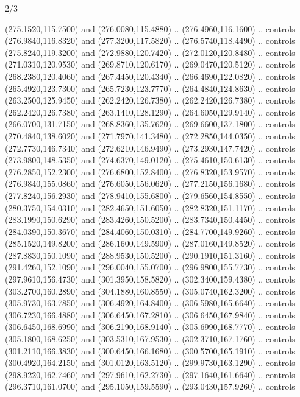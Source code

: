 \begin{flagdescription}{2/3}
\begin{scope}[xshift=0.5\flaglength,yshift=0.5\flagwidth,scale=\flagwidth/259.2]
\begin{scope}[y=0.8pt, x=0.8pt, yscale=-1,shift={(-243,-162)}]
      (275.1520,115.7500) and (276.0080,115.4880) .. (276.4960,116.1600) .. controls
      (276.9840,116.8320) and (277.3200,117.5820) .. (276.5740,118.4490) .. controls
      (275.8240,119.3200) and (272.9880,120.7420) .. (272.0120,120.8480) .. controls
      (271.0310,120.9530) and (269.8710,120.6170) .. (269.0470,120.5120) .. controls
      (268.2380,120.4060) and (267.4450,120.4340) .. (266.4690,122.0820) .. controls
      (265.4920,123.7300) and (265.7230,123.7770) .. (264.4840,124.8630) .. controls
      (263.2500,125.9450) and (262.2420,126.7380) .. (262.2420,126.7380) .. controls
      (262.2420,126.7380) and (263.1410,128.1290) .. (264.6050,129.9140) .. controls
      (266.0700,131.7150) and (268.8360,135.7620) .. (269.6600,137.1800) .. controls
      (270.4840,138.6020) and (271.7970,141.3480) .. (272.2850,144.0350) .. controls
      (272.7730,146.7340) and (272.6210,146.9490) .. (273.2930,147.7420) .. controls
      (273.9800,148.5350) and (274.6370,149.0120) .. (275.4610,150.6130) .. controls
      (276.2850,152.2300) and (276.6800,152.8400) .. (276.8320,153.9570) .. controls
      (276.9840,155.0860) and (276.6050,156.0620) .. (277.2150,156.1680) .. controls
      (277.8240,156.2930) and (278.9410,155.6800) .. (279.6560,154.8550) .. controls
      (280.3750,154.0310) and (282.4650,151.6050) .. (282.8320,151.1170) .. controls
      (283.1990,150.6290) and (283.4260,150.5200) .. (283.7340,150.4450) .. controls
      (284.0390,150.3670) and (284.4060,150.0310) .. (284.7700,149.9260) .. controls
      (285.1520,149.8200) and (286.1600,149.5900) .. (287.0160,149.8520) .. controls
      (287.8830,150.1090) and (288.9530,150.5200) .. (290.1910,151.3160) .. controls
      (291.4260,152.1090) and (296.0040,155.0700) .. (296.9800,155.7730) .. controls
      (297.9610,156.4730) and (301.3950,158.5820) .. (302.3400,159.4380) .. controls
      (303.2700,160.2890) and (304.1880,160.8550) .. (305.0740,162.3200) .. controls
      (305.9730,163.7850) and (306.4920,164.8400) .. (306.5980,165.6640) .. controls
      (306.7230,166.4880) and (306.6450,167.2810) .. (306.6450,167.9840) .. controls
      (306.6450,168.6990) and (306.2190,168.9140) .. (305.6990,168.7770) .. controls
      (305.1800,168.6250) and (303.5310,167.9530) .. (302.3710,167.1760) .. controls
      (301.2110,166.3830) and (300.6450,166.1680) .. (300.5700,165.1910) .. controls
      (300.4920,164.2150) and (301.0120,163.5120) .. (299.9730,163.1290) .. controls
      (298.9220,162.7460) and (297.9610,162.2730) .. (297.1640,161.6640) .. controls
      (296.3710,161.0700) and (295.1050,159.5590) .. (293.0430,157.9260) .. controls

\end{scope}
\end{scope}
\end{flagdescription}
